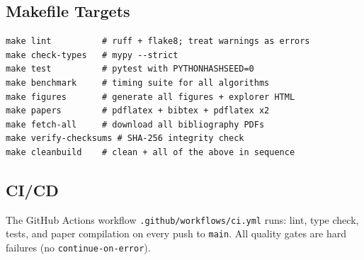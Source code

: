 \subsection{Makefile Targets}

\begin{verbatim}
make lint          # ruff + flake8; treat warnings as errors
make check-types   # mypy --strict
make test          # pytest with PYTHONHASHSEED=0
make benchmark     # timing suite for all algorithms
make figures       # generate all figures + explorer HTML
make papers        # pdflatex + bibtex + pdflatex x2
make fetch-all     # download all bibliography PDFs
make verify-checksums # SHA-256 integrity check
make cleanbuild    # clean + all of the above in sequence
\end{verbatim}

\subsection{CI/CD}

The GitHub Actions workflow \texttt{.github/workflows/ci.yml} runs:
lint, type check, tests, and paper compilation on every push to
\texttt{main}.  All quality gates are hard failures (no
\texttt{continue-on-error}).
